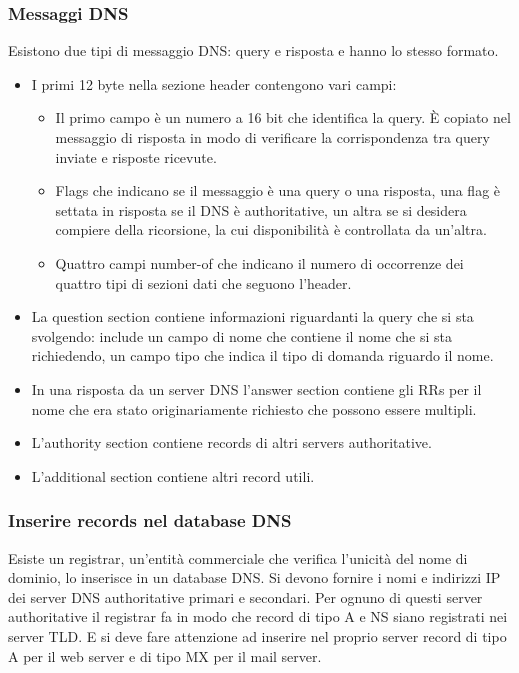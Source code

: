 \subsubsection{Messaggi DNS}
Esistono due tipi di messaggio DNS: query e risposta e hanno lo stesso formato. 
\begin{itemize}
\item I primi 12 byte nella sezione header contengono vari campi:
\begin{itemize}
\item Il primo campo \`e un numero a 16 bit che identifica la query. \`E copiato nel messaggio di risposta in modo di verificare la corrispondenza tra query inviate e risposte ricevute.
\item Flags che indicano se il messaggio \`e una query o una risposta, una flag \`e settata in risposta se il DNS \`e authoritative, un altra se si desidera compiere della ricorsione, la cui disponibilit\`a \`e controllata
da un'altra. 
\item Quattro campi number-of che indicano il numero di occorrenze dei quattro tipi di sezioni dati che seguono l'header.
\end{itemize}
\item La question section contiene informazioni riguardanti la query che si sta svolgendo: include un campo di nome che contiene il nome che si sta richiedendo, un campo tipo che indica il tipo di domanda 
riguardo il nome.
\item In una risposta da un server DNS l'answer section contiene gli RRs per il nome che era stato originariamente richiesto che possono essere multipli.
\item L'authority section contiene records di altri servers authoritative.
\item L'additional section contiene altri record utili.
\end{itemize}
\subsubsection{Inserire records nel database DNS}
Esiste un registrar, un'entit\`a commerciale che verifica l'unicit\`a del nome di dominio, lo inserisce in un database DNS. Si devono fornire i nomi e indirizzi IP dei server DNS authoritative primari e secondari. Per ognuno di questi server authoritative il registrar fa in modo che record di tipo A e NS
siano registrati nei server TLD. E si deve fare attenzione ad inserire nel proprio server record di tipo A per il web server e di tipo MX per il mail 
server.
